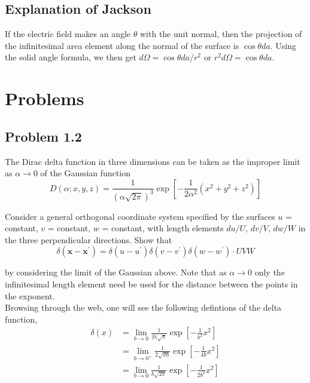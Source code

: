 \subsection{Explanation of Jackson}

If the electric field makes an angle $\theta$ with the unit normal, then the projection of the
infinitesimal area element along the normal of the surface is $\cos\theta da$.
Using the solid angle formula, we then get $d\Omega = \cos\theta da / r^2$ or
$r^2 d\Omega = \cos\theta da$.



\section{Problems}

\subsection{Problem 1.2}
\label{jackson:problem-1.2}


The Dirac delta function in three dimensions can be taken as the improper limit as $\alpha \rightarrow 0$ of the
Gaussian function
$$
D\left(\alpha ; x, y, z \right) =
    \frac{1}{\left(\alpha \sqrt{2\pi}\right)^3}
    \exp{ \left[ -\frac{1}{2\alpha^2} \left( x^2 + y^2 + z^2 \right) \right] }
$$

Consider a general orthogonal coordinate system specified by the surfaces $u$ = constant, $v$ = constant,
$w$ = constant, with length elements $du/U$, $dv/V$, $dw/W$ in the three perpendicular directions.
Show that
$$
\delta\left( \mathbf{x} - \mathbf{x}^\prime \right) =
    \delta\left(u - u^\prime\right) \delta\left(v - v^\prime\right) \delta\left(w - w^\prime\right) \cdot UVW
$$

by considering the limit of the Gaussian above.
Note that as $\alpha \rightarrow 0$ only the infinitesimal length
element need be used for the distance between the points in the exponent.
\\

Browsing through the web, one will see the following defintions of the delta function,
\begin{align*}
\delta (x) &= \lim_{b\rightarrow 0} \frac{1}{|b|\sqrt{\pi}} \exp{ \left[ -\frac{1}{b^2} x^2 \right]} \\
    &= \lim_{b\rightarrow 0^+} \frac{1}{2\sqrt{\pi b}} \exp{ \left[ -\frac{1}{4b} x^2 \right]} \\
    &= \lim_{b\rightarrow 0} \frac{1}{b \sqrt{2\pi}} \exp{ \left[ -\frac{1}{2b^2} x^2 \right]}
\end{align*}

